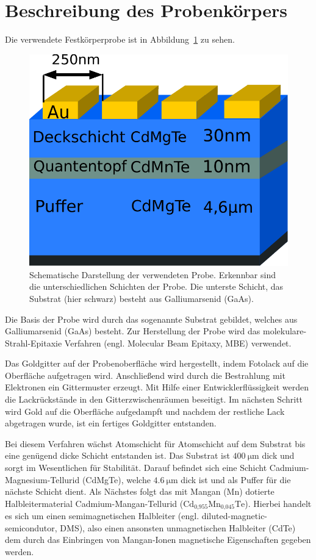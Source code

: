 \section{Beschreibung des Probenkörpers}\label{sec:probe}
Die verwendete Festkörperprobe ist in Abbildung~\ref{fig:probe} zu sehen.
\begin{figure}
    \centering
    \includegraphics[scale=0.5]{./Plots/probe.pdf}
    \caption{Schematische Darstellung der verwendeten Probe. 
    Erkennbar sind die unterschiedlichen Schichten der Probe.
    Die unterste Schicht, das Substrat (hier schwarz) besteht aus Galliumarsenid (GaAs).}
    \label{fig:probe}
\end{figure}
\FloatBarrier

Die Basis der Probe wird durch das sogenannte Substrat gebildet, welches aus Galliumarsenid (GaAs) besteht.
Zur Herstellung der Probe wird das molekulare-Strahl-Epitaxie Verfahren (engl. Molecular Beam Epitaxy, MBE)
verwendet.

Das Goldgitter auf der Probenoberfläche wird hergestellt, indem Fotolack auf die Oberfläche aufgetragen wird.
Anschließend wird durch die Bestrahlung mit Elektronen ein Gittermuster erzeugt. 
Mit Hilfe einer Entwicklerflüssigkeit werden die Lackrückstände in den Gitterzwischenräumen beseitigt.
Im nächsten Schritt wird Gold auf die Oberfläche aufgedampft und nachdem der restliche Lack abgetragen
wurde, ist ein fertiges Goldgitter entstanden.

Bei diesem Verfahren wächst Atomschicht für Atomschicht auf dem Substrat bis eine genügend dicke Schicht entstanden ist.
Das Substrat ist $\SI{400}{\micro\meter}$ dick und sorgt im Wesentlichen für Stabilität.
Darauf befindet sich eine Schicht Cadmium-Magnesium-Tellurid (CdMgTe), welche $\SI{4,6}{\micro\meter}$ dick ist
und als Puffer für die nächste Schicht dient.
Als Nächstes folgt das mit Mangan (Mn) dotierte Halbleitermaterial Cadmium-Mangan-Tellurid
($\text{Cd}_\text{0,955}\text{Mn}_\text{0,045}\text{Te}$). 
Hierbei handelt es sich um einen semimagnetischen Halbleiter (engl. diluted-magnetic-semicondutor, DMS)\cite{allg_paper},
also einen ansonsten unmagnetischen Halbleiter (CdTe) dem durch das Einbringen 
von Mangan-Ionen magnetische Eigenschaften gegeben werden.

